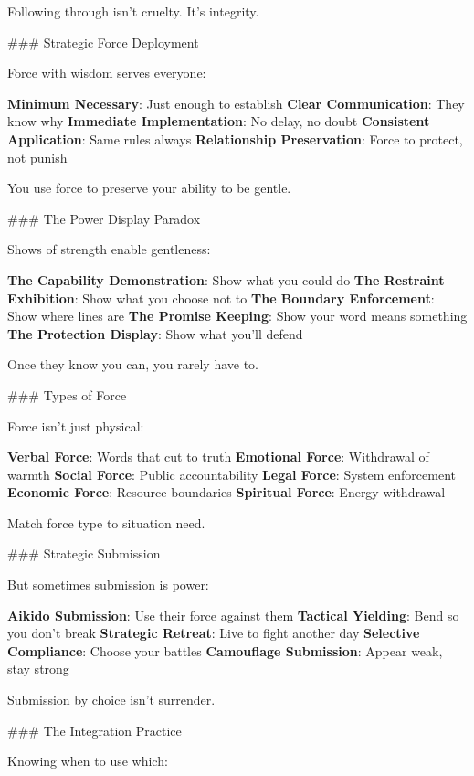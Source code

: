 \documentclass[12pt]{book}
\begin{document}
Following through isn't cruelty. It's integrity.

\#\#\# Strategic Force Deployment

Force with wisdom serves everyone:

\textbf{Minimum Necessary}: Just enough to establish
\textbf{Clear Communication}: They know why
\textbf{Immediate Implementation}: No delay, no doubt
\textbf{Consistent Application}: Same rules always
\textbf{Relationship Preservation}: Force to protect, not punish

You use force to preserve your ability to be gentle.

\#\#\# The Power Display Paradox

Shows of strength enable gentleness:

\textbf{The Capability Demonstration}: Show what you could do
\textbf{The Restraint Exhibition}: Show what you choose not to
\textbf{The Boundary Enforcement}: Show where lines are
\textbf{The Promise Keeping}: Show your word means something
\textbf{The Protection Display}: Show what you'll defend

Once they know you can, you rarely have to.

\#\#\# Types of Force

Force isn't just physical:

\textbf{Verbal Force}: Words that cut to truth
\textbf{Emotional Force}: Withdrawal of warmth
\textbf{Social Force}: Public accountability
\textbf{Legal Force}: System enforcement
\textbf{Economic Force}: Resource boundaries
\textbf{Spiritual Force}: Energy withdrawal

Match force type to situation need.

\#\#\# Strategic Submission

But sometimes submission is power:

\textbf{Aikido Submission}: Use their force against them
\textbf{Tactical Yielding}: Bend so you don't break
\textbf{Strategic Retreat}: Live to fight another day
\textbf{Selective Compliance}: Choose your battles
\textbf{Camouflage Submission}: Appear weak, stay strong

Submission by choice isn't surrender.

\#\#\# The Integration Practice

Knowing when to use which:
\end{document}
